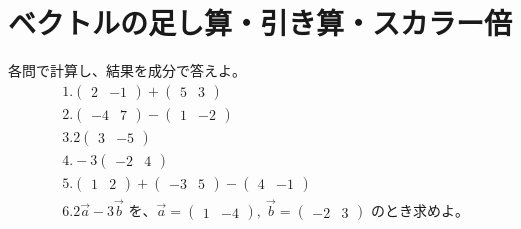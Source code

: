 \documentclass[paper=b4j,landscape,twocolumn,fleqn]{jlreq}
\begin{document}
\section{ベクトルの足し算・引き算・スカラー倍}
各問で計算し、結果を成分で答えよ。
\begin{align*}
　&1.　\begin{pmatrix}2 & -1\end{pmatrix}+\begin{pmatrix}5 & 3\end{pmatrix}\\[0.45em]
　&2.　\begin{pmatrix}-4 & 7\end{pmatrix}-\begin{pmatrix}1 & -2\end{pmatrix}\\[0.45em]
　&3.　2\begin{pmatrix}3 & -5\end{pmatrix}\\[0.45em]
　&4.　-3\begin{pmatrix}-2 & 4\end{pmatrix}\\[0.45em]
　&5.　\begin{pmatrix}1 & 2\end{pmatrix}+\begin{pmatrix}-3 & 5\end{pmatrix}-\begin{pmatrix}4 & -1\end{pmatrix}\\[0.45em]
　&6.　2\vec{a}-3\vec{b}\text{ を、}\vec{a}=\begin{pmatrix}1 & -4\end{pmatrix},\ \vec{b}=\begin{pmatrix}-2 & 3\end{pmatrix}\text{ のとき求めよ。}\\[0.45em]
\end{align*}
\end{document}
